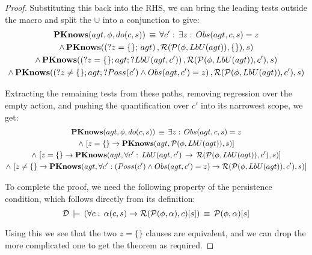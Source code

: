 \begin{proof}
Substituting this back into the RHS, we can bring the leading tests
outside the macro and split the $\cup$ into a conjunction to give:\begin{multline*}
\mathbf{PKnows}(agt,\phi,do(c,s))\,\equiv\,\forall c':\,\exists z:\, Obs(agt,c,s)=z\\
\wedge\,\mathbf{PKnows}(\left(?z=\{\};\, agt\right),\mathcal{R}(\mathcal{P}(\phi,LbU(agt)),\{\}),s)\\
\wedge\,\mathbf{PKnows}(\left(?z=\{\};agt;?LbU(agt,c')\right),\mathcal{R}(\mathcal{P}(\phi,LbU(agt)),c'),s)\\
\wedge\,\mathbf{PKnows}(\left(?z\neq\{\};agt;?Poss(c')\wedge Obs(agt,c')=z\right),\mathcal{R}(\mathcal{P}(\phi,LbU(agt)),c'),s)\end{multline*}


Extracting the remaining tests from these paths, removing regression
over the empty action, and pushing the quantification over $c'$ into
its narrowest scope, we get:\begin{multline*}
\mathbf{PKnows}(agt,\phi,do(c,s))\,\equiv\,\exists z:\, Obs(agt,c,s)=z\\
\wedge\,\left[z=\{\}\rightarrow\mathbf{PKnows}(agt,\mathcal{P}(\phi,LbU(agt)),s)\right]\\
\wedge\,\left[z=\{\}\rightarrow\mathbf{PKnows}(agt,\forall c':\, LbU(agt,c')\,\rightarrow\,\mathcal{R}(\mathcal{P}(\phi,LbU(agt)),c'),s)\right]\\
\wedge\,\left[z\neq\{\}\rightarrow\mathbf{PKnows}(agt,\forall c':\left(Poss(c')\wedge Obs(agt,c')=z\right)\rightarrow\mathcal{R}(\mathcal{P}(\phi,LbU(agt)),c'),s)\right]\end{multline*}


To complete the proof, we need the following property of the persistence
condition, which follows directly from its definition:\[
\mathcal{D}\,\models\,\left(\forall c:\,\alpha(c,s)\rightarrow\mathcal{R}(\mathcal{P}(\phi,\alpha),c)[s]\right)\,\equiv\,\mathcal{P}(\phi,\alpha)[s]\]


Using this we see that the two $z=\{\}$ clauses are equivalent, and
we can drop the more complicated one to get the theorem as required.
\end{proof}
\medskip{}


